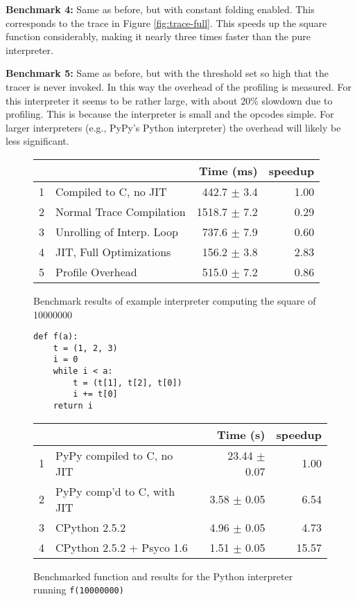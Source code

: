 \documentclass{sig-alternate}
\newcommand\eg{e.g.,\xspace}
\begin{document}
\textbf{Benchmark 4:} Same as before, but with constant folding enabled. This corresponds to the
trace in Figure \ref{fig:trace-full}. This speeds up the square function considerably,
making it nearly three times faster than the pure interpreter.

\textbf{Benchmark 5:} Same as before, but with the threshold set so high that the tracer is
never invoked. In this way the overhead of the profiling is measured. For this interpreter
it seems to be rather large, with about 20\% slowdown due to profiling. This is because the interpreter 
is small and the opcodes simple. For larger interpreters (\eg PyPy's Python
interpreter) the overhead will likely be less significant.

\begin{figure}
\noindent
\begin{tabular}{|l|l|r|r|}
\hline
& &Time (ms) &speedup\\
\hline
1 &Compiled to C, no JIT &442.7 $\pm$ 3.4 &1.00\\
2 &Normal Trace Compilation &1518.7 $\pm$ 7.2 &0.29\\
3 &Unrolling of Interp. Loop &737.6 $\pm$ 7.9 &0.60\\
4 &JIT, Full Optimizations &156.2 $\pm$ 3.8 &2.83\\
5 &Profile Overhead &515.0 $\pm$ 7.2 &0.86\\
\hline
\end{tabular}
\caption{Benchmark results of example interpreter computing the square of
\label{fig:bench1}
10000000}
\end{figure}

\begin{figure}[h]
\label{fig:bench-example}
{\small
\begin{verbatim}
def f(a):
    t = (1, 2, 3)
    i = 0
    while i < a:
        t = (t[1], t[2], t[0])
        i += t[0]
    return i
\end{verbatim}
}
\noindent
\begin{tabular}{|l|l|r|r|}
\hline
& &Time (s) &speedup\\
\hline
1 &PyPy compiled to C, no JIT &23.44 $\pm$ 0.07 &1.00\\
2 &PyPy comp'd to C, with JIT &3.58 $\pm$ 0.05 &6.54\\
3 &CPython 2.5.2 &4.96 $\pm$ 0.05 &4.73\\
4 &CPython 2.5.2 + Psyco 1.6 &1.51 $\pm$ 0.05 &15.57\\\hline
\end{tabular}

\caption{Benchmarked function and results for the Python interpreter running
\texttt{f(10000000)} \label{fig:bench-python}}
\end{figure}
\end{document}

